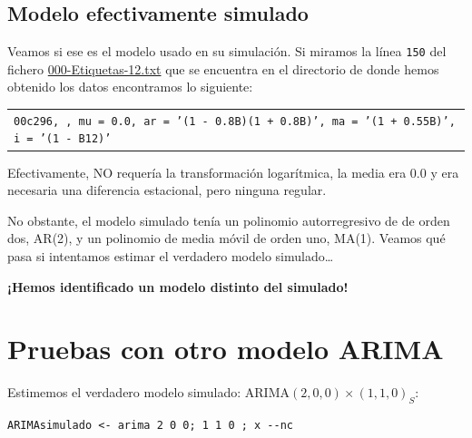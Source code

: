 \documentclass[10pt]{article}
\begin{document}
\subsection*{Modelo efectivamente simulado}
\label{sec:orgcb18dc8}

Veamos si ese es el modelo usado en su simulación. Si miramos la línea
\texttt{150} del fichero \href{IdentificaEstosARIMA/000-Etiquetas-12.txt}{000-Etiquetas-12.txt} que se encuentra en el directorio de
donde hemos obtenido los datos encontramos lo siguiente:
\medskip

\begin{center}
\begin{tabular}{l}
\texttt{00c296,	    ,	mu = 0.0,	ar = '(1 - 0.8B)(1 + 0.8B)', ma = '(1 + 0.55B)', i = '(1 - B12)'}\\
\end{tabular}
\end{center}

\medskip

Efectivamente, NO requería la transformación logarítmica, la media era
\(0.0\) y era necesaria una diferencia estacional, pero ninguna regular.

No obstante, el modelo simulado tenía un polinomio autorregresivo de
de orden dos, AR(2), y un polinomio de media móvil de orden uno,
MA(1). Veamos qué pasa si intentamos estimar el verdadero modelo
simulado\ldots{}

\textbf{¡Hemos identificado un modelo distinto del simulado!}
\section*{Pruebas con otro modelo ARIMA}
\label{sec:org520bd91}

Estimemos el verdadero modelo simulado: ARIMA\((2,0,0)\times(1,1,0)_{S}\):

\begin{verbatim}
ARIMAsimulado <- arima 2 0 0; 1 1 0 ; x --nc 
\end{verbatim}
\end{document}
